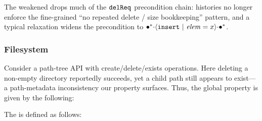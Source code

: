 \vspace{-.4cm}\par\nobreak\noindent
The weakened \tyName{} drops much of the \(\boldsymbol{{\tt delReq}}\) precondition chain: histories no longer enforce the fine-grained ``no repeated delete / size bookkeeping'' pattern, and a typical relaxation widens the precondition to \({\bullet^*} {\cdot} {\langle} {\boldsymbol{{\tt insert}}~|~{\mathit{elem} = x}} {\rangle} {\cdot} {\bullet^*}\).

\newpage
\subsubsection*{Filesystem}
Consider a path-tree API with create/delete/exists operations. Here deleting a non-empty directory reportedly succeeds, yet a child path still appears to exist---a path-metadata inconsistency our property surfaces. Thus, the global property is given by the following:
\vspace{-.35cm}\par{}
\vspace{-.4cm}\par\nobreak\noindent
The \tyName{} is defined as follows:

